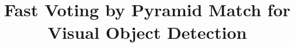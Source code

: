 \documentclass[paper]{ieice}
\title{Fast Voting by Pyramid Match for Visual Object Detection}
\begin{document}
\maketitle
\begin{summary}

\end{summary}
\begin{keywords}

\end{keywords}















\end{document}
